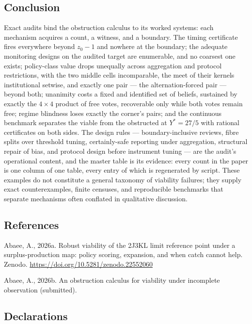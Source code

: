 \documentclass[10pt,twocolumn]{article}
\theoremstyle{definition}
\begin{document}
\subsection{Conclusion}\label{conclusion}

Exact audits bind the obstruction calculus to its worked systems: each
mechanism acquires a count, a witness, and a boundary. The timing
certificate fires everywhere beyond \(z_0 - 1\) and nowhere at the
boundary; the adequate monitoring designs on the audited target are
enumerable, and no coarsest one exists; policy-class value drops
unequally across aggregation and protocol restrictions, with the two
middle cells incomparable, the meet of their kernels institutional
setwise, and exactly one pair --- the alternation-forced pair --- beyond
both; unanimity costs a fixed and identified set of beliefs, sustained
by exactly the \(4 \times 4\) product of free votes, recoverable only
while both votes remain free; regime blindness loses exactly the
corner's pairs; and the continuous benchmark separates the viable from
the obstructed at \(Y^{*} = 27/5\) with rational certificates on both
sides. The design rules --- boundary-inclusive reviews, fibre splits
over threshold tuning, certainly-safe reporting under aggregation,
structural repair of bias, and protocol design before instrument tuning
--- are the audit's operational content, and the master table is its
evidence: every count in the paper is one column of one table, every entry of which is regenerated by script. These examples do not constitute a general taxonomy of viability failures; they supply exact counterexamples, finite censuses, and reproducible benchmarks that separate mechanisms often conflated in qualitative discussion.

\subsection*{References}

Abaee, A., 2026a. Robust viability of the 2J3KL limit reference point
under a surplus-production map: policy scoring, expansion, and when
catch cannot help. Zenodo.
\url{https://doi.org/10.5281/zenodo.22552060}

Abaee, A., 2026b. An obstruction calculus for viability under
incomplete observation (submitted).

\subsection*{Declarations}
\end{document}

